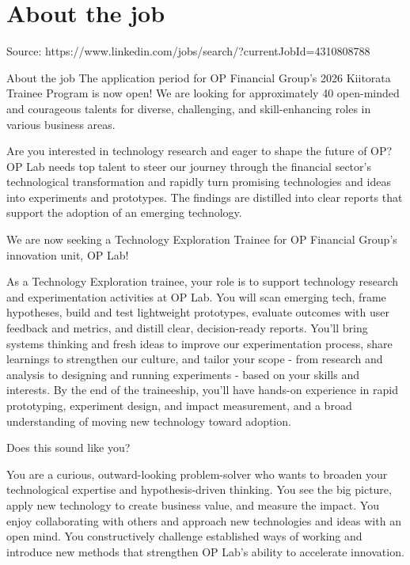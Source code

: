 \documentclass[a4paper,11pt]{article}
\begin{document}
	
	

	\section{About the job}

Source: https://www.linkedin.com/jobs/search/?currentJobId=4310808788

About the job
The application period for OP Financial Group's 2026 Kiitorata Trainee Program is now open! We are looking for approximately 40 open-minded and courageous talents for diverse, challenging, and skill-enhancing roles in various business areas.

Are you interested in technology research and eager to shape the future of OP? OP Lab needs top talent to steer our journey through the financial sector’s technological transformation and rapidly turn promising technologies and ideas into experiments and prototypes. The findings are distilled into clear reports that support the adoption of an emerging technology.

We are now seeking a Technology Exploration Trainee for OP Financial Group’s innovation unit, OP Lab!

As a Technology Exploration trainee, your role is to support technology research and experimentation activities at OP Lab. You will scan emerging tech, frame hypotheses, build and test lightweight prototypes, evaluate outcomes with user feedback and metrics, and distill clear, decision-ready reports. You’ll bring systems thinking and fresh ideas to improve our experimentation process, share learnings to strengthen our culture, and tailor your scope - from research and analysis to designing and running experiments - based on your skills and interests. By the end of the traineeship, you’ll have hands-on experience in rapid prototyping, experiment design, and impact measurement, and a broad understanding of moving new technology toward adoption.

Does this sound like you?

You are a curious, outward-looking problem-solver who wants to broaden your technological expertise and hypothesis-driven thinking. You see the big picture, apply new technology to create business value, and measure the impact. You enjoy collaborating with others and approach new technologies and ideas with an open mind. You constructively challenge established ways of working and introduce new methods that strengthen OP Lab’s ability to accelerate innovation.
\end{document}
